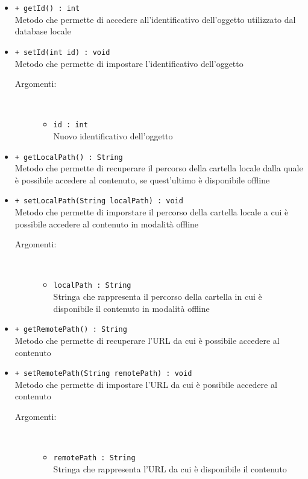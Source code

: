 \documentclass[../Tesi.tex]{subfiles}
\begin{document}
\begin{description}
\begin{itemize}
				\item \texttt{+ getId() : int}\\
				Metodo che permette di accedere all'identificativo dell'oggetto utilizzato dal database locale 

				\item \texttt{+ setId(int id) : void}\\
				Metodo che permette di impostare l'identificativo dell'oggetto
				\begin{description}
					\item[Argomenti:] \
					\begin{itemize}
						\item \texttt{id : int}\\
						Nuovo identificativo dell'oggetto
					\end{itemize}
				\end{description}

				\item \texttt{+ getLocalPath() : String}\\
				Metodo che permette di recuperare il percorso della cartella locale dalla quale è possibile accedere al contenuto, se quest'ultimo è disponibile offline

				\item \texttt{+ setLocalPath(String localPath) : void}\\
				Metodo che permette di imporstare il percorso della cartella locale a cui è possibile accedere al contenuto in modalità offline
				\begin{description}
					\item[Argomenti:] \
					\begin{itemize}
						\item \texttt{localPath : String}\\
						Stringa che rappresenta il percorso della cartella in cui è disponibile il contenuto in modalità offline
					\end{itemize}
				\end{description}

				\item \texttt{+ getRemotePath() : String}\\
				Metodo che permette di recuperare l'URL da cui è possibile accedere al contenuto

				\item \texttt{+ setRemotePath(String remotePath) : void}\\
				Metodo che permette di impostare l'URL da cui è possibile accedere al contenuto
				\begin{description}
					\item[Argomenti:] \
					\begin{itemize}
						\item \texttt{remotePath : String}\\
						Stringa che rappresenta l'URL da cui è disponibile il contenuto
					\end{itemize}
				\end{description}


\end{itemize}
\end{description}
\end{document}
